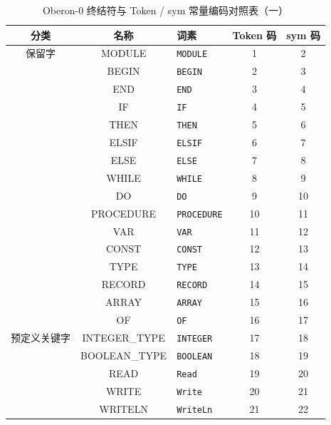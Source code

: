 \documentclass[a4paper]{article}
\begin{document}
\begin{table}[H]
\centering
\caption{Oberon-0 终结符与 Token / sym 常量编码对照表（一）}
\label{tab:terminal1}
\begin{tabular}{@{}cclcc@{}}
\toprule
\textbf{分类} & \textbf{名称} & \textbf{词素} & \textbf{Token 码} & \textbf{sym 码} \\
\midrule
保留字 & MODULE   & \texttt{MODULE}    & 1  & 2  \\
       & BEGIN    & \texttt{BEGIN}     & 2  & 3  \\
       & END      & \texttt{END}       & 3  & 4  \\
       & IF       & \texttt{IF}        & 4  & 5  \\
       & THEN     & \texttt{THEN}      & 5  & 6  \\
       & ELSIF    & \texttt{ELSIF}     & 6  & 7  \\
       & ELSE     & \texttt{ELSE}      & 7  & 8  \\
       & WHILE    & \texttt{WHILE}     & 8  & 9  \\
       & DO       & \texttt{DO}        & 9  & 10 \\
       & PROCEDURE& \texttt{PROCEDURE} & 10 & 11 \\
       & VAR      & \texttt{VAR}       & 11 & 12 \\
       & CONST    & \texttt{CONST}     & 12 & 13 \\
       & TYPE     & \texttt{TYPE}      & 13 & 14 \\
       & RECORD   & \texttt{RECORD}    & 14 & 15 \\
       & ARRAY    & \texttt{ARRAY}     & 15 & 16 \\
       & OF       & \texttt{OF}        & 16 & 17 \\
\midrule
预定义关键字 & INTEGER\_TYPE & \texttt{INTEGER}    & 17 & 18 \\
             & BOOLEAN\_TYPE & \texttt{BOOLEAN}    & 18 & 19 \\
             & READ    & \texttt{Read}       & 19 & 20 \\
             & WRITE   & \texttt{Write}      & 20 & 21 \\
             & WRITELN & \texttt{WriteLn}    & 21 & 22 \\
\bottomrule
\end{tabular}
\end{table}
\end{document}
